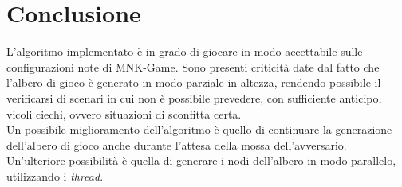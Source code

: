 \documentclass[11pt]{article}
\begin{document}
\section*{Conclusione}
L'algoritmo implementato è in grado di giocare in modo accettabile sulle configurazioni note di MNK-Game. Sono presenti criticità date dal fatto che l'albero di gioco è generato in modo parziale in altezza, rendendo possibile il verificarsi di scenari in cui non è possibile prevedere, con sufficiente anticipo, vicoli ciechi, ovvero situazioni di sconfitta certa.\\
Un possibile miglioramento dell'algoritmo è quello di continuare la generazione dell'albero di gioco anche durante l'attesa della mossa dell'avversario.\\
Un'ulteriore possibilità è quella di generare i nodi dell'albero in modo parallelo, utilizzando i \textit{thread}.
\end{document}
